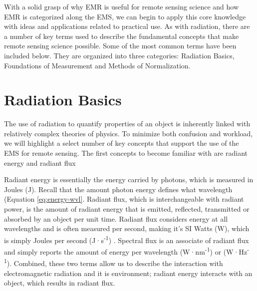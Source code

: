 \documentclass[
]{book}
\begin{document}
With a solid grasp of why EMR is useful for remote sensing science and
how EMR is categorized along the EMS, we can begin to apply this core
knowledge with ideas and applications related to practical use. As with
radiation, there are a number of key terms used to describe the
fundamental concepts that make remote sensing science possible. Some of
the most common terms have been included below. They are organized into
three categories: Radiation Basics, Foundations of Measurement and
Methods of Normalization.

\hypertarget{radiation-basics}{%
\section{\texorpdfstring{\textbf{Radiation Basics}}{Radiation Basics}}\label{radiation-basics}}

The use of radiation to quantify properties of an object is
inherently linked with relatively complex theories of physics. To
minimize both confusion and workload, we will highlight a select number
of key concepts that support the use of the EMS for remote sensing. The
first concepts to become familiar with are radiant energy and
radiant flux

Radiant energy is essentially the energy carried by photons,
which is measured in Joules (J). Recall that the amount photon
energy defines what wavelength (Equation \eqref{eq:energy-wvl}.
Radiant flux, which is interchangeable with radiant power, is the amount
of radiant energy that is emitted, reflected, transmitted or
absorbed by an object per unit time. Radiant flux considers energy
at all wavelengths and is often measured per second, making it's SI
Watts (W), which is simply Joules per second (J·s\textsuperscript{-1}) . Spectral flux is an
associate of radiant flux and simply reports the amount of energy
per wavelength (W·nm\textsuperscript{-1}) or (W·Hz\textsuperscript{-1}). Combined, these two terms allow us to
describe the interaction with electromagnetic radiation and it is
environment; radiant energy interacts with an object, which results
in radiant flux.
\end{document}
